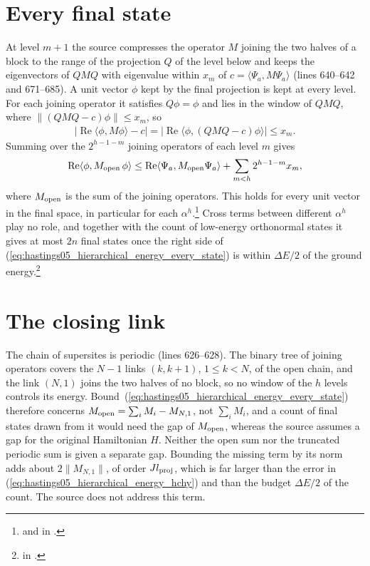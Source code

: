 \documentclass{article}
\begin{document}
\section{Every final state}
At level $m+1$ the source compresses the operator $M$ joining the two halves
of a block to the range of the projection $Q$ of the level below and keeps
the eigenvectors of $QMQ$ with eigenvalue within $x_m$ of
$c=\langle\Psi_a,M\Psi_a\rangle$ (lines 640--642 and 671--685). A unit vector
$\phi$ kept by the final projection is kept at every level. For each joining
operator it satisfies $Q\phi=\phi$ and lies in the window of $QMQ$, where
$\|(QMQ-c)\phi\|\le x_m$, so
\begin{align}
 |\operatorname{Re}\langle\phi,M\phi\rangle-c|
 =|\operatorname{Re}\langle\phi,(QMQ-c)\phi\rangle|\le x_m.
 \label{eq:hastings05_hierarchical_energy_window}
\end{align}
Summing over the $2^{h-1-m}$ joining operators of each level $m$ gives
\begin{align}
 \operatorname{Re}\langle\phi,M_{\rm open}\,\phi\rangle
 \le\operatorname{Re}\langle\Psi_a,M_{\rm open}\Psi_a\rangle
 +\sum_{m<h}2^{h-1-m}x_m,
 \label{eq:hastings05_hierarchical_energy_every_state}
\end{align}
where $M_{\rm open}$ is the sum of the joining operators. This holds for every
unit vector in the final space, in particular for each
$\alpha^h$.\footnote{
    and
    in .}
Cross terms between different $\alpha^h$ play no role, and together with the
count of low-energy orthonormal states it gives at most $2n$ final states
once the right side of
(\ref{eq:hastings05_hierarchical_energy_every_state}) is within $\Delta E/2$
of the ground energy.\footnote{
    in .}

\section{The closing link}
The chain of supersites is periodic (lines 626--628). The binary tree of joining
operators covers the $N-1$ links $(k,k+1)$, $1\le k<N$, of the open chain,
and the link $(N,1)$ joins the two halves of no block, so no window of the $h$
levels controls its energy. Bound~(\ref{eq:hastings05_hierarchical_energy_every_state})
therefore concerns $M_{\rm open}=\sum_iM_i-M_{N,1}$, not $\sum_iM_i$, and a count
of final states drawn from it would need the gap of $M_{\rm open}$, whereas the
source assumes a gap for the original Hamiltonian $H$. Neither the open
sum nor the truncated periodic sum is given a separate gap. Bounding the
missing term by its norm adds
about $2\|M_{N,1}\|$, of order $Jl_{\rm proj}$, which is far larger than the
error in (\ref{eq:hastings05_hierarchical_energy_hchy}) and than the budget
$\Delta E/2$ of the count. The source does not address this term.
\end{document}
